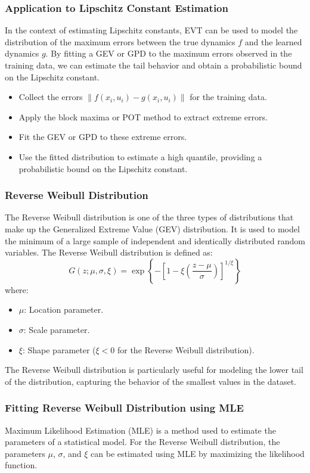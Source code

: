 \documentclass{article}
\begin{document}
\subsubsection{Application to Lipschitz Constant Estimation}
In the context of estimating Lipschitz constants, EVT can be used to model the distribution of the maximum errors between the true dynamics \( f \) and the learned dynamics \( g \). By fitting a GEV or GPD to the maximum errors observed in the training data, we can estimate the tail behavior and obtain a probabilistic bound on the Lipschitz constant.

\begin{itemize}
    \item Collect the errors \( \|f(x_i, u_i) - g(x_i, u_i)\| \) for the training data.
    \item Apply the block maxima or POT method to extract extreme errors.
    \item Fit the GEV or GPD to these extreme errors.
    \item Use the fitted distribution to estimate a high quantile, providing a probabilistic bound on the Lipschitz constant.
\end{itemize}

\subsubsection{Reverse Weibull Distribution}
The Reverse Weibull distribution is one of the three types of distributions that make up the Generalized Extreme Value (GEV) distribution. It is used to model the minimum of a large sample of independent and identically distributed random variables. The Reverse Weibull distribution is defined as:
\[
G(z; \mu, \sigma, \xi) = \exp \left\{ - \left[ 1 - \xi \left( \frac{z - \mu}{\sigma} \right) \right]^{1/\xi} \right\}
\]
where:
\begin{itemize}
    \item \( \mu \): Location parameter.
    \item \( \sigma \): Scale parameter.
    \item \( \xi \): Shape parameter (\( \xi < 0 \) for the Reverse Weibull distribution).
\end{itemize}
The Reverse Weibull distribution is particularly useful for modeling the lower tail of the distribution, capturing the behavior of the smallest values in the dataset.

\subsubsection{Fitting Reverse Weibull Distribution using MLE}
Maximum Likelihood Estimation (MLE) is a method used to estimate the parameters of a statistical model. For the Reverse Weibull distribution, the parameters \( \mu \), \( \sigma \), and \( \xi \) can be estimated using MLE by maximizing the likelihood function.
\end{document}
